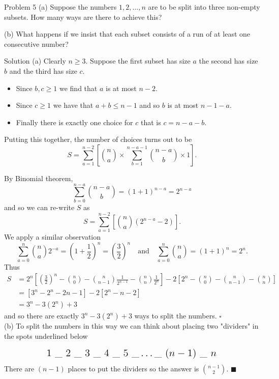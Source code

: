 \documentclass{article}
\begin{document}
\begin{problem}{Problem 5}
(a) Suppose the numbers $1,2,\ldots, n$ are to be split into three
non-empty subsets. How many ways are there to achieve this?
\vspace{0.2cm}

(b) What happens if we insist that each subset consists of a run of at least
one consecutive number?
\end{problem}

\begin{solution}{Solution}
(a) Clearly $n\geq3$.
Suppose the first subset has size $a$ the second has size $b$ and the
third has size $c$.
\begin{itemize}
\item Since $b,c \geq 1$ we find that $a$ is at most $n-2$.
\item Since $c\geq 1$ we have that $a+b \leq n-1$ and so $b$ is at most
$n-1-a$.
\item Finally there is exactly one choice for $c$ that is $c = n-a-b$.
\end{itemize}
Putting this together, the number of choices turns out to be
$$
S = \sum_{a=1}^{n-2}\left[ \binom{n}{a} \times \sum_{b=1}^{n-a-1}
\binom{n-a}{b} \times 1 \right].
$$

By Binomial theorem,
$$
\sum_{b=0}^{n-a} \binom{n-a}{b} = (1+1)^{n-a} = 2^{n-a}
$$
and so we can re-write $S$ as
$$
S = \sum_{a=1}^{n-2} \left[ \binom{n}{a} (2^{n-a} - 2)\right].
$$
We apply a similar observation
$$
\sum_{a=0}^n \binom{n}{a} 2^{-a} = \left(1 + \frac12\right)^n =
\left(\frac32\right)^n
\quad
\text{and}
\quad
\sum_{a=0}^n \binom{n}{a} = (1+1)^n = 2^n.
$$
Thus
\[
\begin{aligned}
S &= 2^n \left[ \left(\frac32\right)^n - \binom{n}{0} -
\binom{n}{n-1}\frac{1}{2^{n-1}} - \binom{n}{n} \frac{1}{2^n} \right] -
2\left[2^n - \binom{n}{0} - \binom{n}{n-1} - \binom{n}{n}\right]\\
&= \left[3^n - 2^n - 2n - 1 \right] - 2\left[2^n - n - 2\right]\\
&= 3^n - 3(2^n) + 3
\end{aligned}
\]
and so there are exactly $3^n - 3(2^n) + 3$ ways to split the numbers.
$\square$\\

(b) To split the numbers in this way we can think about placing two
"dividers" in the spots underlined below

$$
\text{
\Large
$1\ \_ \ 2\ \_ \ 3\ \_ \ 4 \ \_ \ 5 \ \_ \ldots \_ \ (n-1) \ \_ \ n$
}
$$
There are $(n-1)$ places to put the dividers so the answer is
$\binom{n-1}{2}$. $\blacksquare$
\end{solution}
\newpage
\end{document}

